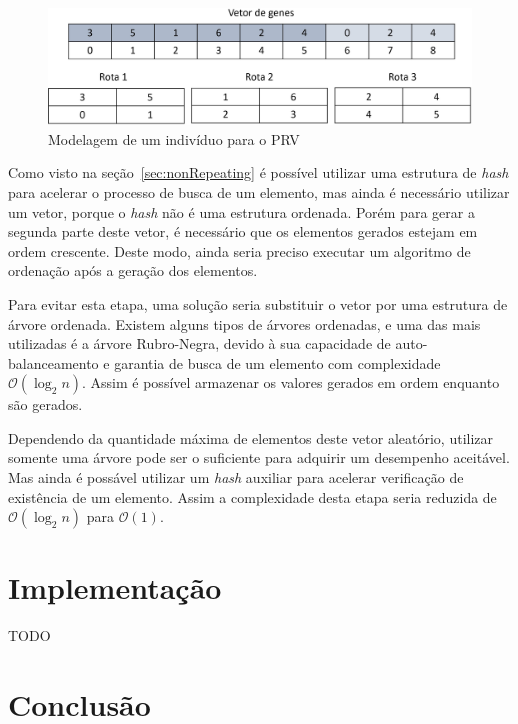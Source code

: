 \documentclass[12pt]{article}
\begin{document}
\begin{figure}[ht]
    \centering
    \includegraphics[width=.8\textwidth]{vrp_genes.jpg}
    \caption{Modelagem de um indiv\'{i}duo para o PRV}
    \label{fig:vrpGenes}
\end{figure}

Como visto na se\c{c}\~{a}o~\ref{sec:nonRepeating} \'{e} poss\'{i}vel utilizar uma estrutura de \textit{hash} para
acelerar o processo de busca de um elemento, mas ainda \'{e} necess\'{a}rio utilizar um vetor, porque o
\textit{hash} n\~{a}o \'{e} uma estrutura ordenada. Por\'{e}m para gerar a segunda parte deste vetor, \'{e} necess\'{a}rio que
os elementos gerados estejam em ordem crescente. Deste modo, ainda seria preciso executar um
algoritmo de ordena\c{c}\~{a}o ap\'{o}s a gera\c{c}\~{a}o dos elementos.

Para evitar esta etapa, uma solu\c{c}\~{a}o seria substituir o vetor por uma estrutura de \'{a}rvore ordenada. Existem
alguns tipos de \'{a}rvores ordenadas, e uma das mais utilizadas \'{e} a \'{a}rvore Rubro-Negra, devido \`{a} sua
capacidade de auto-balanceamento e garantia de busca de um elemento com complexidade $\mathcal{O}(\log_2n)$.
Assim \'{e} poss\'{i}vel armazenar os valores gerados em ordem enquanto s\~{a}o gerados.

Dependendo da quantidade m\'{a}xima de elementos deste vetor aleat\'{o}rio, utilizar somente uma \'{a}rvore pode
ser o suficiente para adquirir um desempenho aceit\'{a}vel. Mas ainda \'{e} poss\'{a}vel utilizar um \textit{hash}
auxiliar para acelerar verifica\c{c}\~{a}o de exist\^{e}ncia de um elemento. Assim a complexidade desta etapa seria reduzida
de $\mathcal{O}(\log_2n)$ para $\mathcal{O}(1)$.

\section{Implementa\c{c}\~{a}o}

TODO

\section{Conclus\~{a}o}
\end{document}
